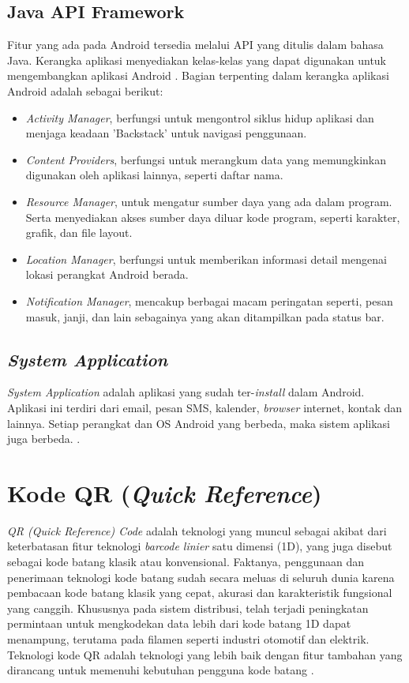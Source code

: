 \subsection{Java API Framework}
Fitur yang ada pada Android tersedia melalui API yang ditulis dalam bahasa Java. Kerangka aplikasi menyediakan kelas-kelas yang dapat digunakan untuk mengembangkan aplikasi Android \citep{android2017}. Bagian terpenting dalam kerangka aplikasi Android adalah sebagai berikut:
\begin{itemize}
	\item \textit{Activity Manager}, berfungsi untuk mengontrol siklus hidup aplikasi dan menjaga keadaan 'Backstack' untuk navigasi penggunaan.
	\item \textit{Content Providers}, berfungsi untuk merangkum data yang memungkinkan digunakan oleh aplikasi lainnya, seperti daftar nama.
	\item \textit{Resource Manager}, untuk mengatur sumber daya yang ada dalam program. Serta menyediakan akses sumber daya diluar kode program, seperti karakter, grafik, dan file layout.
	\item \textit{Location Manager}, berfungsi untuk memberikan informasi detail mengenai lokasi perangkat Android berada.
	\item \textit{Notification Manager}, mencakup berbagai macam peringatan seperti, pesan masuk, janji, dan lain sebagainya yang akan ditampilkan pada status bar.
\end{itemize}

\subsection{\textit{System Application}}
\textit{System Application} adalah aplikasi yang sudah ter-\textit{install} dalam Android. Aplikasi ini terdiri dari email, pesan SMS, kalender, \textit{browser} internet, kontak dan lainnya. Setiap perangkat dan OS Android yang berbeda, maka sistem aplikasi juga berbeda. \citep{android2017}.

\section{Kode QR (\textit{Quick Reference})}
\textit{QR (Quick Reference) Code} adalah teknologi yang muncul sebagai akibat dari keterbatasan fitur teknologi \textit{barcode linier} satu dimensi (1D), yang juga disebut sebagai kode batang klasik atau konvensional. Faktanya, penggunaan dan penerimaan teknologi kode batang sudah secara meluas di seluruh dunia karena pembacaan kode batang klasik yang cepat, akurasi dan karakteristik fungsional yang canggih. Khususnya pada sistem distribusi, telah terjadi peningkatan permintaan untuk mengkodekan data lebih dari kode batang 1D dapat menampung, terutama pada filamen seperti industri otomotif dan elektrik. Teknologi kode QR adalah teknologi yang lebih baik dengan fitur tambahan yang dirancang untuk memenuhi kebutuhan pengguna kode batang \citep{aktas2017}.

